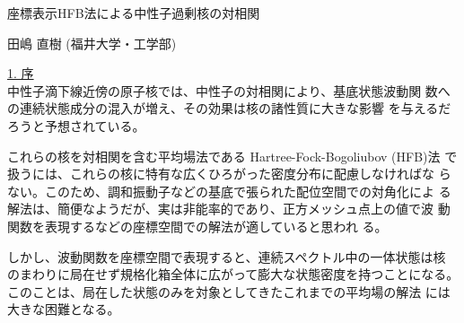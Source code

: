 %
\topmargin=-14mm
\oddsidemargin=-5mm   %
\evensidemargin=-5mm  %
\textheight=247mm %
\textwidth=170mm  %
\newcommand{\mysection}[1]{\vspace{\baselineskip} \noindent \underline{#1} \\}
\newcommand{\vecrp}[0]{{\vec{r}\,}'}

\baselineskip=0.6cm

\begin{center}
{\Large
座標表示HFB法による中性子過剰核の対相関
}
\end{center}


\begin{flushright}
田嶋 直樹 (福井大学・工学部)
\end{flushright}


\mysection{1. 序}

中性子滴下線近傍の原子核では、中性子の対相関により、基底状態波動関
数への連続状態成分の混入が増え、その効果は核の諸性質に大きな影響
を与えるだろうと予想されている。

これらの核を対相関を含む平均場法である Hartree-Fock-Bogoliubov (HFB)法
で扱うには、これらの核に特有な広くひろがった密度分布に配慮しなければな
らない。このため、調和振動子などの基底で張られた配位空間での対角化によ
る解法は、簡便なようだが、実は非能率的であり、正方メッシュ点上の値で波
動関数を表現するなどの座標空間での解法\cite{BFH85}が適していると思われ
る。

しかし、波動関数を座標空間で表現すると、連続スペクトル中の一体状態は核
のまわりに局在せず規格化箱全体に広がって膨大な状態密度を持つことになる。
このことは、局在した状態のみを対象としてきたこれまでの平均場の解法
には大きな困難となる\cite{THF96,Taj98a}。


